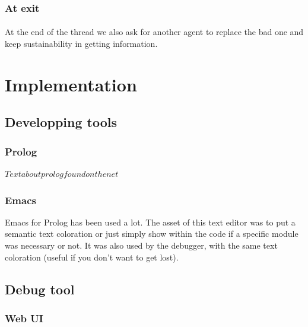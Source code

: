 \documentclass{article}
\begin{document}
		\subsubsection{At exit}
			\paragraph{}
			At the end of the thread we also ask for another agent to replace the bad one and keep sustainability in getting information.

\section{Implementation}
	\subsection{Developping tools}
		\subsubsection{Prolog}
			$Text about prolog found on the net$
		\subsubsection{Emacs}
			Emacs for Prolog has been used a lot.
			The asset of this text editor was to put a semantic text coloration
			or just simply show within the code if a specific module was necessary or not.
			It was also used by the debugger, with the same text coloration (useful if you don't want to get lost).			
	\subsection{Debug tool}
		\subsubsection{Web UI}
\end{document}
